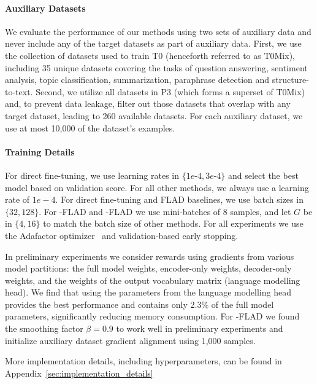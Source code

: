 \paragraph{Auxiliary Datasets}
We evaluate the performance of our methods using two sets of auxiliary data and never include any of the target datasets as part of auxiliary data.
First, we use the collection of datasets used to train T0 (henceforth referred to as T0Mix), including 35 unique datasets covering the tasks of question answering, sentiment analysis, topic classification, summarization, paraphrase detection and structure-to-text.
Second, we utilize all datasets in P3 (which forms a superset of T0Mix) and, to prevent data leakage, filter out those datasets that overlap with any target dataset, leading to 260 available datasets. For each auxiliary dataset, we use at most 10,000 of the dataset's examples.

\paragraph{Training Details}
For direct fine-tuning, we use learning rates in $\{1e$-$4, 3e$-$4\}$ and select the best model based on validation score. For all other methods, we always use a learning rate of $1e-4$. For direct fine-tuning and FLAD baselines, we use batch sizes in $\{32,128\}$. For \ex{}-FLAD and \ucb{}-FLAD we use mini-batches of 8 samples, and let $G$ be in $\{4,16\}$ to match the batch size of other methods. For all experiments we use the Adafactor optimizer~\citep{pmlr-v80-shazeer18a} and validation-based early stopping.

In preliminary experiments we consider rewards using gradients from various model partitions: the full model weights, encoder-only weights, decoder-only weights, and the weights of the output vocabulary matrix (language modelling head). We find that using the parameters from the language modelling head provides the best performance and contains only 2.3\% of the full model parameters, significantly reducing memory consumption.
For \ucb{}-FLAD we found the smoothing factor $\beta=0.9$ to work well in preliminary experiments and initialize auxiliary dataset gradient alignment using 1,000 samples.


More implementation details, including hyperparameters, can be found in Appendix~\ref{sec:implementation_details}